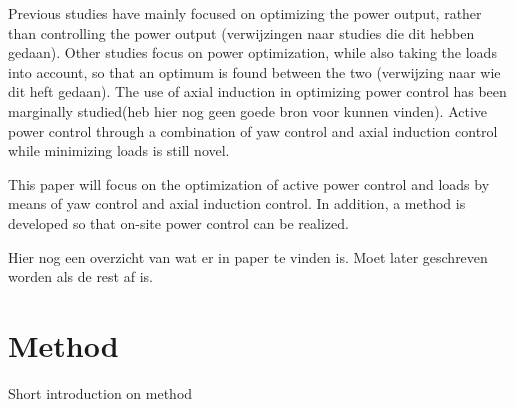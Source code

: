 \documentclass[twoside,twocolumn]{article}
\begin{document}
Previous studies have mainly focused on optimizing the power output, rather than controlling the power output (verwijzingen naar studies die dit hebben gedaan).  Other studies focus on power optimization, while also taking the loads into account, so that an optimum is found between the two (verwijzing naar wie dit heft gedaan). The use of axial induction in optimizing power control has been marginally studied(heb hier nog geen goede bron voor kunnen vinden). Active power control through a combination of yaw control and axial induction control while minimizing loads is still novel.

This paper will focus on the optimization of active power control and loads by means of yaw control and axial induction control. In addition, a method is developed so that on-site power control can be realized.
	
Hier nog een overzicht van wat er in paper te vinden is. Moet later geschreven worden als de rest af is.


	
	\section{Method}
\label{sec:method}
	
	Short introduction on method 
\end{document}
